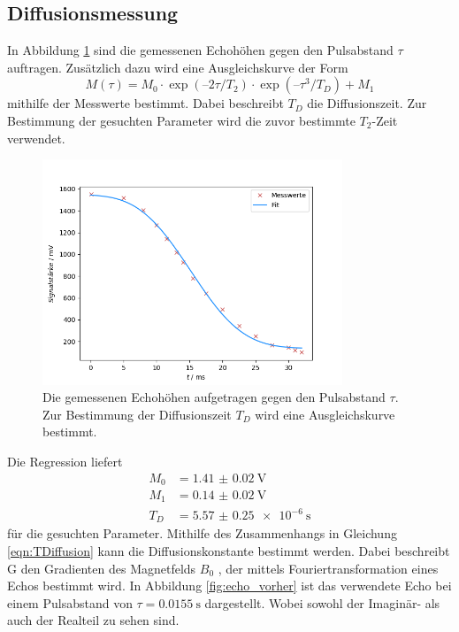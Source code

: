 \subsection{Diffusionsmessung}
In Abbildung \ref{fig:diff_fit} sind die gemessenen Echohöhen gegen den Pulsabstand $\tau$ auftragen.
Zusätzlich dazu wird eine Ausgleichskurve der Form
\begin{equation*}
  M(\tau) = M_0 \cdot \exp(–2\tau/T_2)\cdot \exp(–\tau^3/T_D) + M_1
\end{equation*}
mithilfe der Messwerte bestimmt. Dabei beschreibt $T_D$ die Diffusionszeit. Zur Bestimmung der gesuchten Parameter wird
die zuvor bestimmte $T_2$-Zeit verwendet.
\begin{figure}[H]
  \centering
  \includegraphics[width=0.8\textwidth]{../Auswertung/Diff_fit.png}
  \caption{Die gemessenen Echohöhen aufgetragen gegen den Pulsabstand $\tau$. Zur Bestimmung der Diffusionszeit $T_D$ wird eine
  Ausgleichskurve bestimmt.}
  \label{fig:diff_fit}
\end{figure} \noindent
Die Regression liefert
\begin{align*}
  M_0 &= \SI{1.41(002)}{\volt} \\
  M_1 &= \SI{0.14(002)}{\volt} \\
  T_D &= \SI{5.57(025)e-6}{\second}
\end{align*}
für die gesuchten Parameter.
Mithilfe des Zusammenhangs in Gleichung \eqref{eqn:TDiffusion}
kann die Diffusionskonstante bestimmt werden. Dabei beschreibt G den Gradienten des Magnetfelds $B_0$ , der mittels Fouriertransformation eines Echos
bestimmt wird. In Abbildung \ref{fig:echo_vorher} ist das verwendete Echo bei einem Pulsabstand von $\tau = \SI{0.0155}{\second}$ dargestellt. Wobei sowohl der Imaginär- als auch der Realteil
zu sehen sind.
